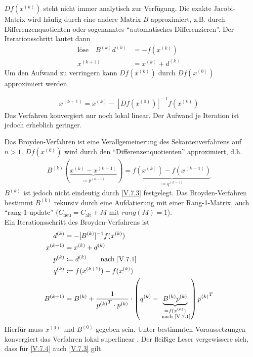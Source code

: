 $Df(x^{(k)})$ steht nicht immer analytisch zur Verfügung.
Die exakte Jacobi-Matrix wird häufig durch eine andere Matrix $B$ approximiert, 
z.B. durch Differenzenquotienten oder sogenanntes
\enquote{automatisches Differenzieren}.
Der Iterationsschritt lautet dann
\begin{align}
\text{löse}\quad B^{(k)}d^{(k)} &= -f(x^{(k)}) 
\label{V.7.1} \\\nonumber
x^{(k+1)} &=x^{(k)} + d^{(k)}
\end{align}
Um den Aufwand zu verringern kann $Df(x^{(k)})$ durch
$Df(x^{(0)})$ approximiert werden.


\begin{gather}
x^{(k+1)} = x^{(k)} -[Df(x^{(0)})]^{-1} f(x^{(k)})
\label{V.7.2}
\end{gather}
Das Verfahren konvergiert nur noch lokal linear.
Der Aufwand je Iteration ist jedoch erheblich geringer.



Das Broyden-Verfahren ist eine Verallgemeinerung des Sekantenverfahrens
auf $n>1$. $Df(x^{(k)})$ wird durch den
\enquote{Differenzenquotienten} approximiert, d.h.
\begin{gather}
B^{(k)}(\underbrace{x^{(k)}-x^{(k-1)}}_{\coloneqq p^{(k-1)}})
= \underbrace{f(x^{(k)})-f(x^{(k-1)})}_{\coloneqq
	q^{(k-1)}}
\label{V.7.3}
\end{gather}
$B^{(k)}$ ist jedoch nicht eindeutig durch \eqref{V.7.3} festgelegt.
Das Broyden-Verfahren bestimmt $B^{(k)}$ rekursiv durch eine 
Aufdatierung mit einer Rang-1-Matrix, auch \enquote{rang-1-update}
($C_\text{neu} = C_\text{alt} +M$ mit $rang(M)=1$). \\

Ein Iterationsschritt des Broyden-Verfahrens ist 
\begin{align}\nonumber
d^{(k)} &= -[B^{(k)}]^{-1} f(x^{(k)}) \\\nonumber
x^{(k+1)} &= x^{(k)} + d^{(k)} \\\nonumber
p^{(k)} & \coloneqq d^{(k)} \qquad \text{nach
	\eqref{V.7.1}}\\\nonumber
q^{(k)} & \coloneqq f(x^{(k+1)})-f(x^{(k)}) \\
B^{(k+1)} & = B^{(k)} + \frac{1}{{p^{(k)}}^T\cdot p^{(k)}}
\cdot \left(q^{(k)}-
\underbrace{B^{(k)}p^{(k)}}_{\substack{=f(x^{(k)})\\
		\text{ nach \eqref{V.7.1}}}}
\right){p^{(k)}}^T
\label{V.7.4}
\end{align}
Hierfür muss $x^{(0)} $ und $B^{(0)}$ gegeben sein.
Unter bestimmten Voraussetzungen konvergiert das Verfahren lokal
superlinear \cite[siehe][dortige Referenzen]{stoerbulirsch}.
Der fleißige Leser vergewissere sich, dass für
\eqref{V.7.4} auch \eqref{V.7.3} gilt.



